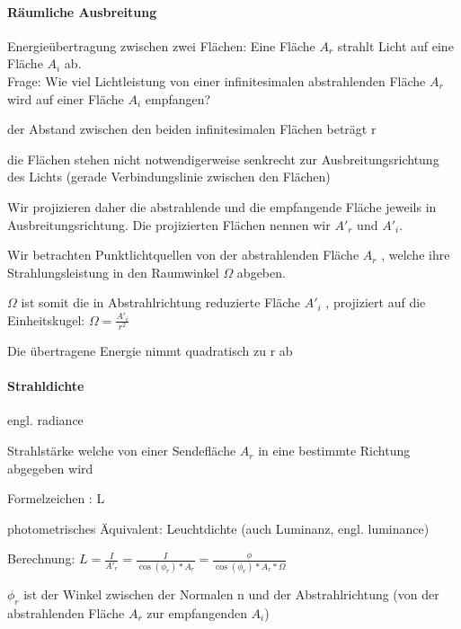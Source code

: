 \documentclass[landscape]{article}
\begin{document}
\begin{multicols}{3}
  \paragraph{Räumliche Ausbreitung}
  Energieübertragung zwischen zwei Flächen:
  Eine Fläche $A_r$ strahlt Licht auf eine Fläche $A_i$ ab.\\
  Frage: Wie viel Lichtleistung von einer infinitesimalen abstrahlenden Fläche $A_r$ wird auf einer Fläche $A_i$ empfangen?
  \begin{itemize*}
    \item der Abstand zwischen den beiden infinitesimalen Flächen beträgt r
    \item die Flächen stehen nicht notwendigerweise senkrecht zur Ausbreitungsrichtung des Lichts (gerade Verbindungslinie zwischen den Flächen)
    \item Wir projizieren daher die abstrahlende und die empfangende Fläche jeweils in Ausbreitungsrichtung. Die projizierten Flächen nennen wir $A'_r$ und $A'_i$.
    \item Wir betrachten Punktlichtquellen von der abstrahlenden Fläche $A_r$ , welche ihre Strahlungsleistung in den Raumwinkel $\Omega$ abgeben.
    \item $\Omega$ ist somit die in Abstrahlrichtung reduzierte Fläche $A'_i$ , projiziert auf die Einheitskugel: $\Omega=\frac{A'_i}{r^2}$
    \item Die übertragene Energie nimmt quadratisch zu r ab
  \end{itemize*}
  
  \paragraph{Strahldichte}
  \begin{itemize*}
    \item engl. radiance
    \item Strahlstärke welche von einer Sendefläche $A_r$ in eine bestimmte Richtung abgegeben wird
    \item Formelzeichen : L
    \item photometrisches Äquivalent: Leuchtdichte (auch Luminanz, engl. luminance)
    \item Berechnung: $L = \frac{I}{A'_r}=\frac{I}{\cos(\phi_r)*A_r} = \frac{\phi}{\cos(\phi_r)*A_r*\Omega}$
    \item $\phi_r$ ist der Winkel zwischen der Normalen n und der Abstrahlrichtung (von der abstrahlenden Fläche $A_r$ zur empfangenden $A_i$)
  \end{itemize*}
  

\end{multicols}
\end{document}
